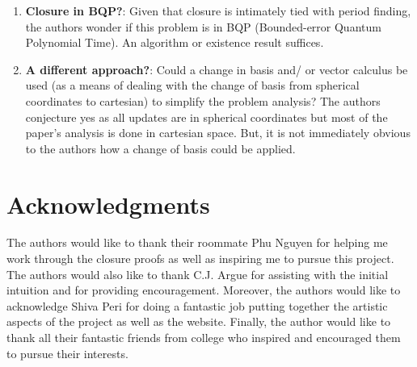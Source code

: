 \documentclass[11pt,titlepage]{article}
\begin{document}
\begin{enumerate}
  \item \textbf{Closure in BQP?}: Given that closure is intimately tied with period finding,
  the authors wonder if this problem is in BQP (Bounded-error Quantum Polynomial Time). An algorithm
  or existence result suffices.

  \item \textbf{A different approach?}: Could a change in basis and/ or vector calculus be used (as a means of dealing 
  with the change of basis from spherical coordinates to cartesian) to simplify the problem analysis?
  The authors conjecture yes as all updates are in spherical coordinates but most of the paper's analysis
  is done in cartesian space. But, it is not immediately obvious to the authors
  how a change of basis could be applied.


\end{enumerate}

\section*{Acknowledgments}
The authors would like to thank their roommate Phu Nguyen for helping me work through the closure proofs
as well as inspiring me to pursue this project. The authors would also like to thank C.J. Argue
for assisting with the initial intuition and for providing encouragement. Moreover, the authors
would like to acknowledge Shiva Peri for doing a fantastic job putting together the artistic aspects
of the project as well as the website. Finally, the author would like to thank all their fantastic friends
from college who inspired and encouraged them to pursue their interests.



\newpage




\end{document}
